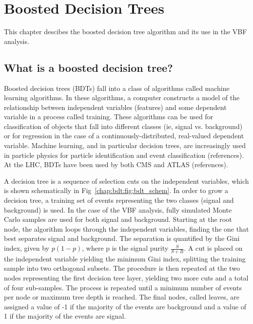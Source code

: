\chapter{Boosted Decision Trees}
\label{chap:bdt}

This chapter descibes the boosted decision tree algorithm and its use
in the VBF \hwwlnln analysis.

\section{What is a boosted decision tree?}

Boosted decision trees (BDTs) fall into a class of algorithms called machine learning
algorithms. In these algorithms, a computer constructs a model of the
relationship between independent variables (features) and some
dependent variable in a process called training. These algorithms can
be used for classification of objects that fall into different classes
(ie, signal vs. background) or for regression in the case of a
continuously-distributed, real-valued dependent variable. Machine
learning, and in particular decision trees, are increasingly used in
particle physics for particle identification and event
classification (references). At the LHC, BDTs have been used by both
CMS and ATLAS (references). 

A decision tree is a sequence of selection cuts on the independent
variables, which is shown schematically in
Fig~\ref{chap:bdt:fig:bdt_schem}. In order to grow a decision tree, a
training set of events representing the two classes (signal and
background) is used. In the case of the VBF analysis, fully simulated
Monte Carlo samples are used for both signal and background. Starting
at the root node, the algorithm loops through the independent
variables, finding the one that best separates signal and
background. The separation is quantified by the Gini index, given by
$p(1-p)$, where p is the signal purity $\frac{S}{S+B}$. A cut is
placed on the independent variable yielding the minimum Gini index,
splitting the training sample into two orthogonal subsets. The
procedure is then repeated at the two nodes representing the first
decision tree layer, yielding two more cuts and a total of four
sub-samples. The process is repeated until a minimum number of events
per node or maximum tree depth is reached. The final nodes, called
leaves, are assigned a value of -1 if the majority of the events are
background and a value of 1 if the majority of the events are signal. 

